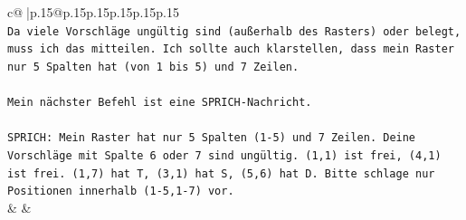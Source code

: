 \documentclass{article}
\begin{document}
{\begin{supertabular}{c@{$\;$}|p{.15\linewidth}@{}p{.15\linewidth}p{.15\linewidth}p{.15\linewidth}p{.15\linewidth}p{.15\linewidth}}
{{{\\ 
\texttt{Da viele Vorschläge ungültig sind (außerhalb des Rasters) oder belegt, muss ich das mitteilen. Ich sollte auch klarstellen, dass mein Raster nur 5 Spalten hat (von 1 bis 5) und 7 Zeilen.} \\
\\ 
\texttt{Mein nächster Befehl ist eine SPRICH{-}Nachricht.} \\
\\ 
\texttt{SPRICH: Mein Raster hat nur 5 Spalten (1{-}5) und 7 Zeilen. Deine Vorschläge mit Spalte 6 oder 7 sind ungültig. (1,1) ist frei, (4,1) ist frei. (1,7) hat T, (3,1) hat S, (5,6) hat D. Bitte schlage nur Positionen innerhalb (1{-}5,1{-}7) vor.} \\
            }
        }
    }
    & & \\ \\


\end{supertabular}}
\end{document}
